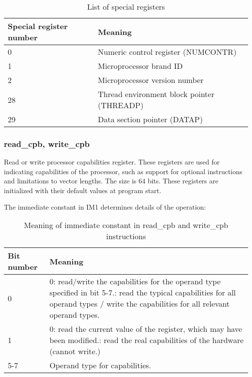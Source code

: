 \documentclass[forwardcom.tex]{subfiles}
\begin{document}
\begin{longtable} {|p{15mm}|p{100mm}|}
\caption{List of special registers} 
\label{table:specialRegisters} \\
\endfirsthead
\endhead
\hline
\bfseries Special register number & \bfseries Meaning  \\
\hline
0 & Numeric control register (NUMCONTR)  \\
1 & Microprocessor brand ID  \\
2 & Microprocessor version number   \\
28 & Thread environment block pointer (THREADP)   \\
29 & Data section pointer (DATAP)  \\
\hline
\end{longtable}


\subsubsection{read\_cpb, write\_cpb}
Read or write processor capabilities register. These registers are used for indicating capabilities of the processor, such as support for optional instructions and limitations to vector lengths. The size is 64 bits. These registers are initialized with their default values at program start.
\vspace{2mm}

The immediate constant in IM1 determines details of the operation:

\begin{longtable} {|p{20mm}|p{90mm}|}
\caption{Meaning of immediate constant in read\_cpb and write\_cpb instructions} 
\label{table:readWriteCpbModes} \\
\endfirsthead
\endhead
\hline
\bfseries Bit number & \bfseries Meaning  \\
\hline
0  &  0: read/write the capabilities for the operand type specified in bit 5-7.\newline
      1: read the typical capabilities for all operand types / write the capabilities for all    
      relevant operand types.  \\
\hline
1  &  0: read the current value of the register, which may have been modified.\newline
      1: read the real capabilities of the hardware (cannot write.) \\
\hline
5-7 & Operand type for capabilities. \\
\hline
\end{longtable}
\end{document}
